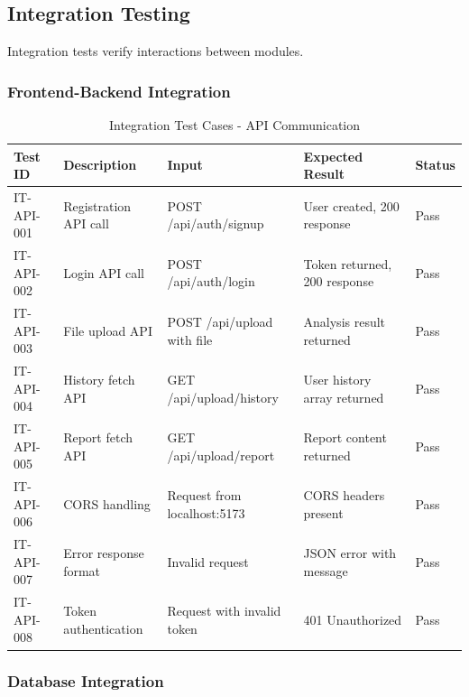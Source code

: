 \documentclass[12pt,a4paper]{article}
\begin{document}
    \subsection{Integration Testing}

    Integration tests verify interactions between modules.

    \subsubsection{Frontend-Backend Integration}

    \begin{table}[H]
        \caption{Integration Test Cases - API Communication}
        \begin{tabular}{|p{2cm}|p{4cm}|p{3cm}|p{3cm}|p{1.5cm}|}
            \hline
            \textbf{Test ID} & \textbf{Description} & \textbf{Input} & \textbf{Expected Result} & \textbf{Status} \\
            \hline
            IT-API-001 & Registration API call & POST /api/auth/signup & User created, 200 response & Pass \\
            \hline
            IT-API-002 & Login API call & POST /api/auth/login & Token returned, 200 response & Pass \\
            \hline
            IT-API-003 & File upload API & POST /api/upload with file & Analysis result returned & Pass \\
            \hline
            IT-API-004 & History fetch API & GET /api/upload/history & User history array returned & Pass \\
            \hline
            IT-API-005 & Report fetch API & GET /api/upload/report & Report content returned & Pass \\
            \hline
            IT-API-006 & CORS handling & Request from localhost:5173 & CORS headers present & Pass \\
            \hline
            IT-API-007 & Error response format & Invalid request & JSON error with message & Pass \\
            \hline
            IT-API-008 & Token authentication & Request with invalid token & 401 Unauthorized & Pass \\
            \hline
        \end{tabular}
    \end{table}

    \subsubsection{Database Integration}
\end{document}
